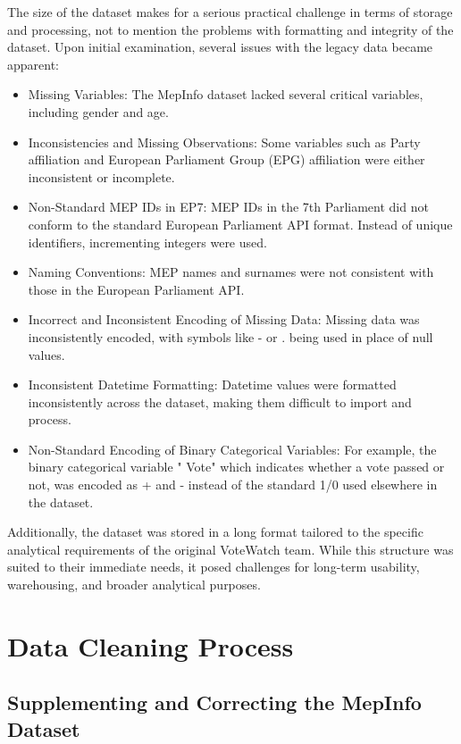 \documentclass{article}
\begin{document}
    The size of the dataset makes for a serious practical challenge in terms of storage and processing, not to
    mention the problems with formatting and integrity of the dataset. Upon initial examination, several issues with the
    legacy data became apparent:

    \begin{itemize}
        \item Missing Variables: The MepInfo dataset lacked several critical variables, including gender and age.
        \item
        Inconsistencies and Missing Observations: Some variables such as Party affiliation and European Parliament Group
        (EPG) affiliation were either inconsistent or incomplete.
        \item
        Non-Standard MEP IDs in EP7: MEP IDs in the 7th Parliament did not conform to the standard European Parliament
        API format. Instead of unique identifiers, incrementing integers were used.
        \item
        Naming Conventions: MEP names and surnames were not consistent with those in the European
        Parliament API.
        \item
        Incorrect and Inconsistent Encoding of Missing Data: Missing data was inconsistently encoded, with symbols like
        - or . being used in place of null values.
        \item
        Inconsistent Datetime Formatting: Datetime values were formatted inconsistently across the dataset, making them
        difficult to import and process.
        \item Non-Standard Encoding of Binary Categorical Variables: For example, the binary categorical variable "
        Vote"
        which indicates whether a vote passed or not, was encoded as + and - instead of the standard 1/0 used elsewhere
        in the dataset.
    \end{itemize}
    Additionally, the dataset was stored in a long format tailored to the specific analytical requirements of the
    original VoteWatch team. While this structure was suited to their immediate needs, it posed challenges for long-term
    usability, warehousing, and broader analytical purposes.


    \section{Data Cleaning Process}

    \subsection{Supplementing and Correcting the MepInfo Dataset}
\end{document}
